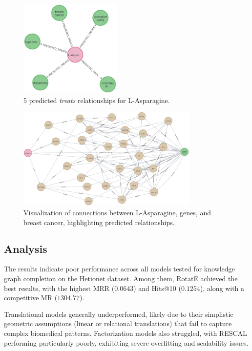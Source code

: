 \begin{figure}[ht]
    \centering
    \includegraphics[width=0.45\textwidth]{images/pykeen/predicted treats}
    \caption{5 predicted \textit{treats} relationships for L-Asparagine.}
    \label{fig:predicted_treats}
\end{figure}

\begin{figure}[ht]
    \centering
    \includegraphics[width=0.8\textwidth]{images/pykeen/results}
    \caption{Visualization of connections between L-Asparagine, genes, and breast cancer, highlighting predicted relationships.}
    \label{fig:kg_visualization}
\end{figure}

\subsection*{Analysis}

The results indicate poor performance across all models tested for knowledge graph completion on the Hetionet dataset.
Among them, RotatE achieved the best results, with the highest MRR ($0.0643$) and Hits@10 ($0.1254$), along with a competitive MR ($1304.77$).

Translational models generally underperformed, likely due to their simplistic geometric assumptions (linear or relational translations) that fail to capture complex biomedical patterns.
Factorization models also struggled, with RESCAL performing particularly poorly, exhibiting severe overfitting and scalability issues.

